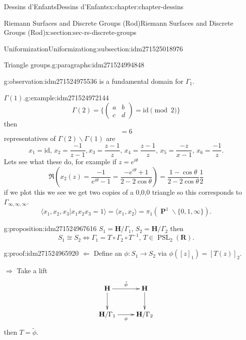 \documentclass[oneside,10pt,]{book}
\numberwithin{equation}{section}
\newcommand{\inv}{^{-1}}
\newcommand{\lb}{[}
\newcommand{\rb}{]}
\newcommand{\RR}{\mathbf{R}}
\newcommand{\HH}{\mathbf{H}}
\newcommand{\id}{\mathrm{id}}
\DeclareMathOperator{\PP}{\mathbf{P}}
\DeclareMathOperator{\PSL}{PSL}
\newcommand{\amp}{&}
\begin{document}
\begin{chapterptx}{Dessins d'Enfants}{}{Dessins d'Enfants}{}{}{x:chapter:chapter-dessins}
\begin{sectionptx}{Riemann Surfaces and Discrete Groups (Rod)}{}{Riemann Surfaces and Discrete Groups (Rod)}{}{}{x:section:sec-rs-discrete-groups}
\begin{subsectionptx}{Uniformization}{}{Uniformization}{}{}{g:subsection:idm271525018976}
\begin{paragraphs}{Triangle groups.}{g:paragraphs:idm271524994848}
\begin{observation}{}{g:observation:idm271524975536}
is a fundamental domain for \(\Gamma_1\).%
\end{observation}
\begin{example}{\(\Gamma(1)\).}{g:example:idm271524972144}%
%
\begin{equation*}
\Gamma(2) = \{\begin{pmatrix} a\amp b \\ c\amp d\end{pmatrix} = \id \pmod 2 \}
\end{equation*}
then%
\begin{equation*}
[\Gamma(1) : \Gamma(2)] = 6
\end{equation*}
representatives of \(\Gamma(2) \backslash \Gamma(1)\) are%
\begin{equation*}
x_1 = \id,\,x_2 = \frac{-1}{z-1}, x_3 = \frac{z-1}{z},\, x_4 = \frac{z-1}{z},\,x_5 = \frac{-z}{x-1},\,x_6 = \frac{-1}{z}\text{.}
\end{equation*}
Lets see what these do, for example if \(z= e^{i\theta}\)%
\begin{equation*}
\Re(x_2(z) = \frac{-1}{e^{i\theta} - 1} = \frac{-e^{i\theta} + 1}{2- 2\cos \theta}) = \frac{1-\cos \theta}{ 2- 2\cos \theta} \frac 12
\end{equation*}
if we plot this we see we get two copies of a 0,0,0 triangle so this corresponds to \(\Gamma_{\infty,\infty,\infty}\).%
\begin{equation*}
\langle x_1, x_2, x_3 | x_1x_2x_3 = 1\rangle = \langle x_1,x_2\rangle = \pi_1(\PP^1\smallsetminus\{0,1,\infty\})\text{.}
\end{equation*}
%
\end{example}
\begin{proposition}{}{}{g:proposition:idm271524967616}%
\(S_1 = \HH/ \Gamma_1\), \(S_2 = \HH/\Gamma_2\) then%
\begin{equation*}
S_1 \cong S_2 \iff \Gamma_1 = T\circ \Gamma_2 \circ T\inv,\,T\in \PSL_2(\RR)\text{.}
\end{equation*}
%
\end{proposition}
\begin{proofptx}{}{g:proof:idm271524965920}
\(\Leftarrow\) Define an \(\phi\colon S_1 \to S_2\) via \(\phi(\lb z\rb_1) = \lb T(z)\rb_2\).%
\par
\(\Rightarrow\) Take a lift%
\begin{equation*}
\xymatrix{
\HH\ar[r]^{\tilde\phi}\ar[d] & \HH\ar[d] \\
\HH/\Gamma_1\ar[r]_\phi & \HH/\Gamma_2
}
\end{equation*}
then \(T= \tilde \phi\).%

\end{proofptx}
\end{paragraphs}
\end{subsectionptx}
\end{sectionptx}
\end{chapterptx}
\end{document}
